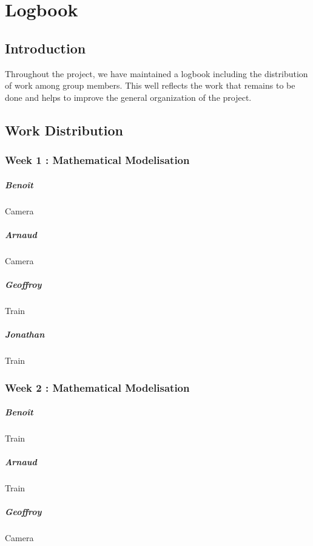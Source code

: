 \chapter{Logbook}
\section{Introduction}

Throughout the project, we have maintained a logbook including the distribution of work among group members. This well reflects the work that remains to be done and helps to improve the general organization of the project.

\section{Work Distribution}

\subsection*{Week 1 : Mathematical Modelisation}
\paragraph{Benoît} Camera
\paragraph{Arnaud} Camera
\paragraph{Geoffroy} Train
\paragraph{Jonathan} Train

\subsection*{Week 2 : Mathematical Modelisation}
\paragraph{Benoît} Train
\paragraph{Arnaud} Train
\paragraph{Geoffroy} Camera
